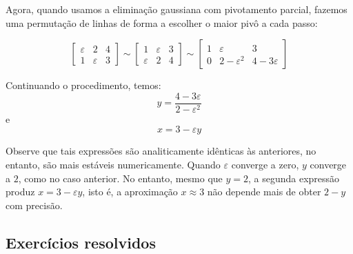 \begin{sol}
Agora, quando usamos a eliminação gaussiana com pivotamento parcial, fazemos uma permutação de linhas de forma a escolher o maior pivô a cada passo:

\begin{equation}\left[\begin{array}{cc|c}
\varepsilon & 2 & 4\\
1 & \varepsilon & 3
\end{array}
\right]\sim
\left[\begin{array}{cc|c}
1 & \varepsilon & 3\\
\varepsilon & 2 & 4
\end{array}
\right]\sim
\left[\begin{array}{cc|c}
1 & \varepsilon & 3\\
0 & 2-\varepsilon^2 & 4-3\varepsilon
\end{array}
\right]
\end{equation}

Continuando o procedimento, temos:
\begin{equation} y=\frac{4-3\varepsilon}{2-\varepsilon^2} \end{equation} e
\begin{equation} x=3-\varepsilon y \end{equation}

Observe que tais expressões são analiticamente idênticas às anteriores, no entanto, são mais estáveis numericamente. Quando $\varepsilon$ converge a zero, $y$ converge a $2$, como no caso anterior. No entanto, mesmo que $y=2$, a segunda expressão produz $x=3-\varepsilon y$, isto é, a aproximação $x\approx 3$ não depende mais de obter $2-y$ com precisão.
\end{sol}

\subsection*{Exercícios resolvidos}

